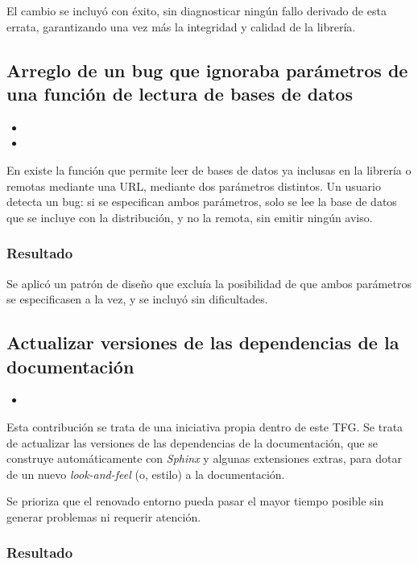 El cambio se incluyó con éxito, sin diagnosticar ningún fallo derivado de esta errata, garantizando una vez más la integridad y calidad de la librería.

\subsection{Arreglo de un bug que ignoraba parámetros de una función de lectura de bases de datos}

\begin{itemize}
    \item {}
    \item {}
\end{itemize}

En \pvlibpy{} existe la función  que permite leer de bases de datos ya inclusas en la librería o remotas mediante una URL, mediante dos parámetros distintos. Un usuario detecta un \gls{bug}: si se especifican ambos parámetros, solo se lee la base de datos que se incluye con la distribución, y no la remota, sin emitir ningún aviso.

\subsubsection{Resultado}

Se aplicó un patrón de diseño que excluía la posibilidad de que ambos parámetros se especificasen a la vez, y se incluyó sin dificultades.

\subsection{Actualizar versiones de las dependencias de la documentación}

\begin{itemize}
    \item {}
\end{itemize}

Esta contribución se trata de una iniciativa propia dentro de este TFG. Se trata de actualizar las versiones de las dependencias de la documentación, que se construye automáticamente con \textit{Sphinx} y algunas extensiones extras, para dotar de un nuevo \textit{look-and-feel} (o, estilo) a la documentación.

Se prioriza que el renovado entorno pueda pasar el mayor tiempo posible sin generar problemas ni requerir atención.

\subsubsection{Resultado}

